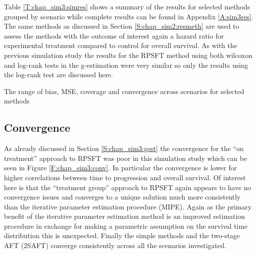 Table \ref{T:chap_sim3:simres} shows a summary of the results for selected methods grouped by scenario while complete results can be found in Appendix \ref{A:sim3res}. The same methods as discussed in Section \ref{S:chap_sim2:resmeth} are used to assess the methods with the outcome of interest again a hazard ratio for experimental treatment compared to control for overall survival. As with the previous simulation study the results for the RPSFT method using both wilcoxon and log-rank tests in the g-estimation were very similar so only the results using the log-rank test are discussed here.

\begin{table}[ht] 
\caption{The range of bias, MSE, coverage and convergence across scenarios for selected methods\label{T:chap_sim3:simres}}
\centering 
\scalebox{0.9}{

}
\end{table}

\clearpage

\subsection{Convergence}

As already discussed in Section \ref{S:chap_sim3:gest} the convergence for the ``on treatment'' approach to RPSFT was poor in this simulation study which can be seen in Figure \ref{F:chap_sim3:conv}. In particular the convergence is lower for higher correlations between time to progression and overall survival. Of interest here is that the ``treatment group'' approach to RPSFT again appears to have no convergence issues and converges to a unique solution much more consistently than the iterative parameter estimation procedure (MIPE). Again as the primary benefit of the iterative parameter estimation method is an improved estimation procedure in exchange for making a parametric assumption on the survival time distribution this is unexpected. Finally the simple methods and the two-stage AFT (2SAFT) converge consistently across all the scenarios investigated. 

